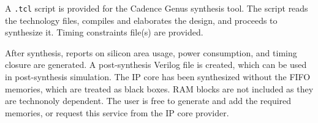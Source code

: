A {\tt .tcl} script is provided for the Cadence Genus synthesis tool. The script
reads the technology files, compiles and elaborates the design, and proceeds to
synthesize it. Timing constraints file(s) are provided.

After synthesis, reports on silicon area usage, power consumption, and timing
closure are generated. A post-synthesis Verilog file is created, which can be
used in post-synthesis simulation. The IP core has been synthesized without the
FIFO memories, which are treated as black boxes. RAM blocks are not included as
they are technonoly dependent. The user is free to generate and add the required
memories, or request this service from the IP core provider.


